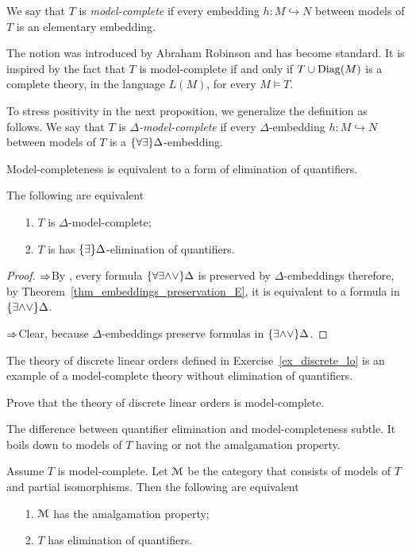 We say that $T$ is \emph{model-complete\/} if every embedding $h:M\hookrightarrow N$ between models of $T$ is an elementary embedding. 

The notion was introduced by Abraham Robinson and has become standard. It is inspired by the fact that $T$ is model-complete if and only if $T\cup{\rm Diag}(M)$ is a complete theory, in the language $L(M)$, for every $M\models T$. 

To stress positivity in the next proposition, we generalize the definition as follows. We say that $T$ is \emph{$\Delta$-model-complete\/} if every $\Delta$-embedding $h:M\hookrightarrow N$ between models of $T$ is a $\{\forall\exists\}\Delta$-embedding. 

Model-completeness is equivalent to a form of elimination of quantifiers.

\begin{proposition}
The following are equivalent
\begin{itemize}
\item[1.] $T$ is $\Delta$-model-complete;
\item[2.] $T$ is has $\{\exists\}\Delta$-elimination of quantifiers.
\end{itemize}
\end{proposition}

\begin{proof}
$\Rightarrow$\quad By , every formula $\{\forall\exists\mathord\wedge\mathord\vee\}\Delta$ is preserved by $\Delta$-embeddings therefore, by Theorem~\ref{thm_embeddings_preservation_E}, it is equivalent to a formula in $\{\exists\mathord\wedge\mathord\vee\}\Delta$.

$\Rightarrow$\quad Clear, because $\Delta$-embeddings preserve formulas in $\{\exists\mathord\wedge\mathord\vee\}\Delta$.
\end{proof}

The theory of discrete linear orders defined in Exercise~\ref{ex_discrete_lo} is an example of a model-complete theory without elimination of quantifiers.

\begin{exercise}
Prove that the theory of discrete linear orders is model-complete.\QED
\end{exercise}

The difference between quantifier elimination and model-completeness subtle. It boils down to models of $T$ having or not the amalgamation property.

\begin{proposition}
Assume $T$ is model-complete. Let $\EuScript M$ be the category that consists of models of $T$ and partial isomorphisms. Then the following are equivalent
\begin{itemize}
\item[1.] $\EuScript M$ has the amalgamation property;
\item[2.] $T$ has elimination of quantifiers.
\end{itemize}
\end{proposition}

